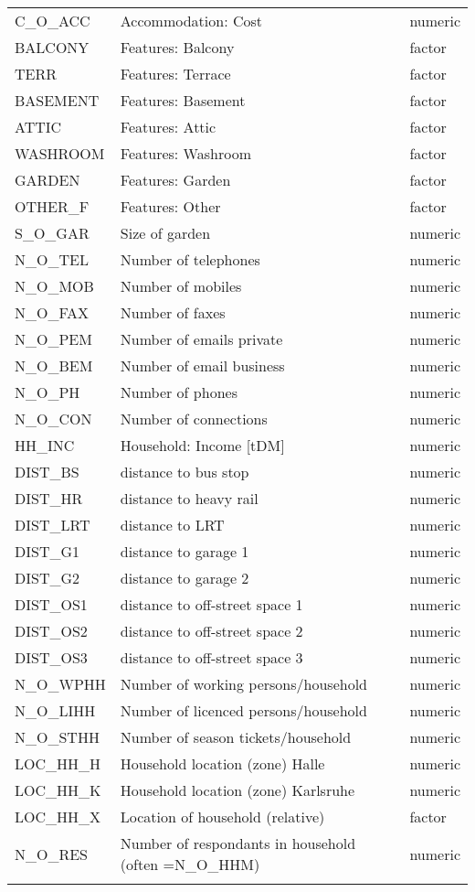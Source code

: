 \begin{longtable}{lll}
  C\_O\_ACC & Accommodation: Cost & numeric \\ 
  BALCONY & Features: Balcony & factor \\ 
  TERR & Features: Terrace & factor \\ 
  BASEMENT & Features: Basement & factor \\ 
  ATTIC & Features: Attic & factor \\ 
  WASHROOM & Features: Washroom & factor \\ 
  GARDEN & Features: Garden & factor \\ 
  OTHER\_F & Features: Other & factor \\ 
  S\_O\_GAR & Size of garden & numeric \\ 
  N\_O\_TEL & Number of telephones & numeric \\ 
  N\_O\_MOB & Number of mobiles & numeric \\ 
  N\_O\_FAX & Number of faxes & numeric \\ 
  N\_O\_PEM & Number of emails private & numeric \\ 
  N\_O\_BEM & Number of email business & numeric \\ 
  N\_O\_PH & Number of phones & numeric \\ 
  N\_O\_CON & Number of connections & numeric \\ 
  HH\_INC & Household: Income [tDM] & numeric \\ 
  DIST\_BS & distance to bus stop & numeric \\ 
  DIST\_HR & distance to heavy rail & numeric \\ 
  DIST\_LRT & distance to LRT & numeric \\ 
  DIST\_G1 & distance to garage 1 & numeric \\ 
  DIST\_G2 & distance to garage 2 & numeric \\ 
  DIST\_OS1 & distance to off-street space 1 & numeric \\ 
  DIST\_OS2 & distance to off-street space 2 & numeric \\ 
  DIST\_OS3 & distance to off-street space 3 & numeric \\ 
  N\_O\_WPHH & Number of working persons/household & numeric \\ 
  N\_O\_LIHH & Number of licenced persons/household & numeric \\ 
  N\_O\_STHH & Number of season tickets/household & numeric \\ 
  LOC\_HH\_H & Household location (zone) Halle & numeric \\ 
  LOC\_HH\_K & Household location (zone) Karlsruhe & numeric \\ 
  LOC\_HH\_X & Location of household (relative) & factor \\ 
  N\_O\_RES & Number of respondants in household (often =N\_O\_HHM) & numeric \\ 
   \hline
\hline
\label{tab:ph_info}
\end{longtable}
